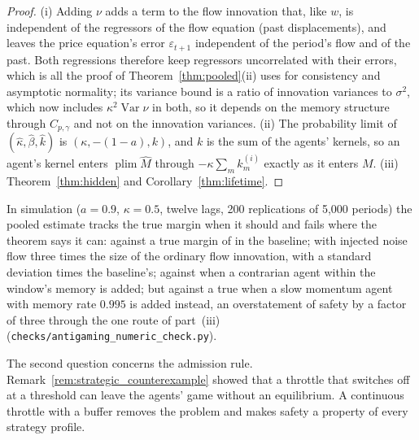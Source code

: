 \begin{proof}
(i) Adding $\nu$ adds a term to the flow innovation that, like $w$, is independent of the regressors of the flow equation (past displacements), and leaves the price equation's error $\varepsilon_{t+1}$ independent of the period's flow and of the past. Both regressions therefore keep regressors uncorrelated with their errors, which is all the proof of Theorem~\ref{thm:pooled}(ii) uses for consistency and asymptotic normality; its variance bound is a ratio of innovation variances to $\sigma^2$, which now includes $\kappa^2\operatorname{Var}\nu$ in both, so it depends on the memory structure through $C_{p,\gamma}$ and not on the innovation variances. (ii) The probability limit of $(\hat\kappa,\hat\beta,\hat k)$ is $(\kappa,-(1-a),k)$, and $k$ is the sum of the agents' kernels, so an agent's kernel enters $\operatorname{plim}\hat M$ through $-\kappa\sum_m k^{(i)}_m$ exactly as it enters $M$. (iii) Theorem~\ref{thm:hidden} and Corollary~\ref{thm:lifetime}.
\end{proof}

In simulation ($a=0.9$, $\kappa=0.5$, twelve lags, 200 replications of 5{,}000 periods) the pooled estimate tracks the true margin when it should and fails where the theorem says it can: \AGbaseEst{} against a true margin of \AGbaseTrue{} in the baseline; \AGnoiseEst{} with injected noise flow three times the size of the ordinary flow innovation, with a standard deviation \AGnoiseSdRatio{} times the baseline's; \AGcontraEst{} against \AGcontraTrue{} when a contrarian agent within the window's memory is added; but \AGslowEst{} against a true \AGslowTrue{} when a slow momentum agent with memory rate $0.995$ is added instead, an overstatement of safety by a factor of three through the one route of part~(iii) (\texttt{checks/antigaming\_numeric\_check.py}).

The second question concerns the admission rule. Remark~\ref{rem:strategic_counterexample} showed that a throttle that switches off at a threshold can leave the agents' game without an equilibrium. A continuous throttle with a buffer removes the problem and makes safety a property of every strategy profile.

